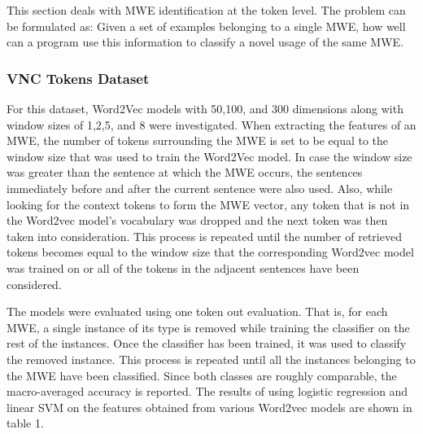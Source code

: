 \documentclass[11pt]{article}
\begin{document}
This section deals with MWE identification at the token level. The problem can be formulated as: Given a set of examples belonging to a single MWE, how well can a program use this information to classify a novel usage of the same MWE.

\subsubsection{VNC Tokens Dataset}


For this dataset, Word2Vec models with 50,100, and 300 dimensions along with window sizes of 1,2,5, and 8 were investigated. When extracting the features of an MWE, the number of tokens surrounding the MWE is set to be equal to the window size that was used to train the Word2Vec model. In case the window size was greater than the sentence at which the MWE occurs, the sentences immediately before and after the current sentence were also used. Also, while looking for the context tokens to form the MWE vector, any token that is not in the Word2vec model's vocabulary was dropped and the next token was then taken into consideration. This process is repeated until the number of retrieved tokens becomes equal to the window size that the corresponding Word2vec model was trained on or all of the tokens in the adjacent sentences have been considered. 


The models were evaluated using one token out evaluation. That is, for each MWE, a single instance of its type is removed while training the classifier on the rest of the instances. Once the classifier has been trained, it was used to classify the removed instance. This process is repeated until all the instances belonging to the MWE have been classified. Since both classes are roughly comparable, the macro-averaged accuracy is reported. The results of using logistic regression and linear SVM on the features obtained from various Word2vec models are shown in table 1.
\end{document}

